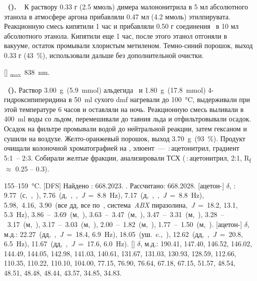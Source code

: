\textbf{~().} ~
К раствору 0.33 г (2.5 ммоль) димера малононитрила в 5 мл абсолютного этанола в атмосфере аргона прибавляли 0.47 мл (4.2 ммоль) этилпирувата. 
Реакционную смесь кипятили 1 час и прибавляли 0.50 г соединения~ в 10 мл абсолютного этанола. 
Кипятили еще 1 час, после этого этанол отгоняли в вакууме, остаток промывали хлористым метиленом. 
Темно-синий порошок, выход 0.33 г (\SI{43}{\percent}), использовали дальше без дополнительной очистки.
\begin{experimental}
    [] \chemlambda\textsubscript{max}~\SI{838}{\nano\metre}.
\end{experimental}

\textbf{~().} 
Раствор \SI{3.00}{\gram}~(\SI{5.9}{\mmol}) альдегида~ и \SI{1.80}{\gram}~(\SI{17.8}{\mmol}) 4-гидроксипиперидина в \SI{50}{\milli\litre} сухого \ac{dmf} нагревали до \SI{100}{\celsius}, выдерживали при этой температуре 6 часов и оставляли на ночь. 
Реакционную смесь выливали в \SI{400}{\milli\litre} воды со льдом, перемешивали до таяния льда и отфильтровывали осадок. 
Осадок на фильтре промывали водой до нейтральной реакции, затем гексаном и сушили на воздухе. 
Желто-оранжевый порошок, выход \SI{3.70}{\gram}~(\SI{93}{\percent}). 
Продукт очищали колоночной хроматографией на , элюент~--- \,:\,ацетонитрил, градиент 5:1~-- 2:3. Собирали желтые фракции, анализировали ТСХ (\,:\,ацетонитрил, 2:1, R\textsubscript{f} $\approx$ 0.25 -- 0.3).
\begin{experimental}[format=\bfseries]
     155--\SI{159}{\celsius}.
    [DFS] Найдено \ce{[M+]}: \num{668.2023}. . Рассчитано:  \num{668.2028}.
    [ацетон-] $\delta$, \si{\ppm}: 9.77~(с,~,~), 7.76~(д,~,~,~\textit{J}~=~8.8~\si{\hertz}), 7.17~(д,~,~,~\textit{J}~=~8.8~\si{\hertz}), 5.98,~4.16,~3.90~(все дд, все по~, система~\emph{ABX} пиразолина,~\textit{J}~=~18.2, 13.1, 5.3~\si{\hertz}), 3.86~--~3.69~(м,~), 3.63~--~3.47~(м,~), 3.47~--~3.31~(м,~), 3.28~--~3.17~(м,~), 3.17~--~3.03~(м,~), 2.00~--~1.82~(м,~), 1.77~--~1.50~(м,~).
    [ацетон-] $\delta$, м.д.: 22.27~(дд,~,~\textit{J}~=~18.4, 6.9~\si{\hertz}), 18.05~(уш.~c.,~), 12.62~(дд,~,~\textit{J}~=~20.8, 6.5~\si{\hertz}), 11.67~(дд,~,~\textit{J}~=~17.6, 6.0~\si{\hertz}).
    [] $\delta$, м.д.: 190.41, 147.40, 146.52, 146.02, 144.49, 144.05, 142.98, 141.03, 140.61, 131.67, 131.03, 130.93, 128.59, 112.66, 110.35, 110.22, 110.10, 104.00, 77.15, 76.90, 76.64, 67.18, 67.15, 51.57, 48.54, 48.51, 48.48, 48.44, 43.57, 34.85, 34.83.
\end{experimental}


